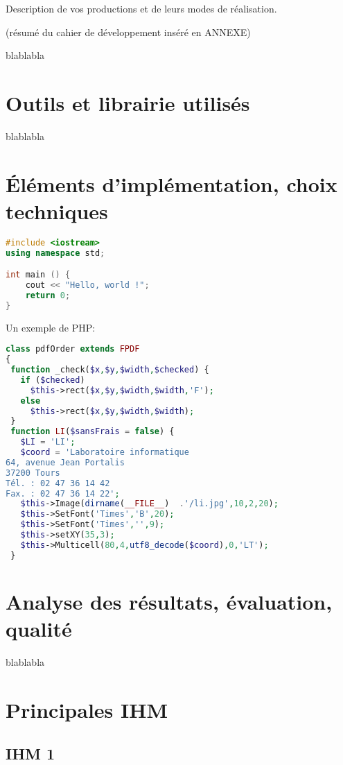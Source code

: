 \documentclass{polytech/polytech}
\numberwithin{figure}{chapter}
\begin{document}
Description de vos productions et de leurs modes de réalisation.

(résumé du cahier de développement inséré en ANNEXE)

blablabla

\section{Outils et librairie utilisés}

blablabla

\section{Éléments d'implémentation, choix techniques}

\begin{lstlisting}[language=C++]
#include <iostream>
using namespace std;

int main () {
    cout << "Hello, world !";
    return 0;
}
\end{lstlisting}

Un exemple de PHP:
\begin{lstlisting}[language=php]
class pdfOrder extends FPDF
{
 function _check($x,$y,$width,$checked) {
   if ($checked)
     $this->rect($x,$y,$width,$width,'F');
   else
     $this->rect($x,$y,$width,$width);
 }
 function LI($sansFrais = false) {
   $LI = 'LI';
   $coord = 'Laboratoire informatique
64, avenue Jean Portalis
37200 Tours
Tél. : 02 47 36 14 42
Fax. : 02 47 36 14 22';
   $this->Image(dirname(__FILE__)  .'/li.jpg',10,2,20);
   $this->SetFont('Times','B',20);
   $this->SetFont('Times','',9);
   $this->setXY(35,3);
   $this->Multicell(80,4,utf8_decode($coord),0,'LT');
 }
\end{lstlisting}

\section{Analyse des résultats, évaluation, qualité}

blablabla


\section{Principales IHM}

\subsection{IHM 1}
\end{document}
